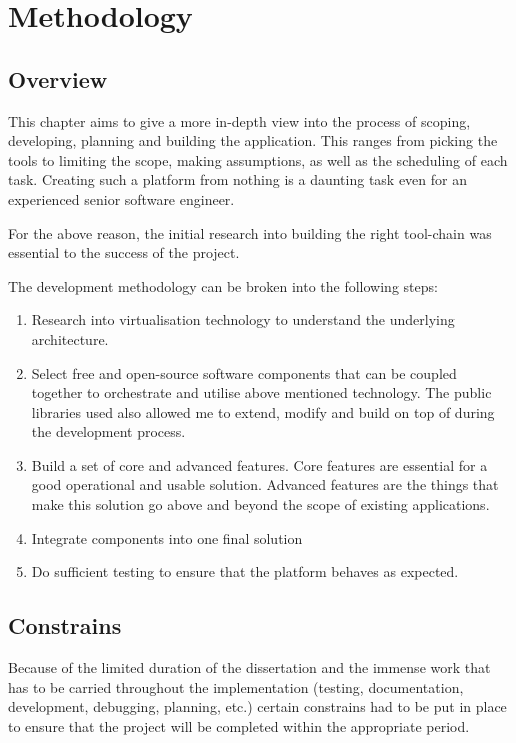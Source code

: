 \documentclass{article}
\begin{document}
\newpage
\section{Methodology}
\subsection{Overview}
This chapter aims to give a more in-depth view into the process of scoping, developing, planning and building the application. This ranges from picking the tools to limiting the scope, making assumptions, as well as the scheduling of each task. Creating such a platform from nothing is a daunting task even for an experienced senior software engineer.

For the above reason, the initial research into building the right tool-chain was essential to the success of the project.

The development methodology can be broken into the following steps:
\begin{enumerate}
    \item
          Research into virtualisation technology to understand the underlying architecture.

    \item
          Select free and open-source software components that can be coupled together to orchestrate and utilise above mentioned technology. The public libraries used also allowed me to extend, modify and build on top of during the development process.

    \item
          Build a set of core and advanced features. Core features are essential for a good operational and usable solution. Advanced features are the things that make this solution go above and beyond the scope of existing applications.

    \item
          Integrate components into one final solution

    \item
          Do sufficient testing to ensure that the platform behaves as expected.
\end{enumerate}

\subsection{Constrains}
Because of the limited duration of the dissertation and the immense work that has to be carried throughout the implementation (testing, documentation, development, debugging, planning, etc.) certain constrains had to be put in place to ensure that the project will be completed within the appropriate period.
\end{document}
